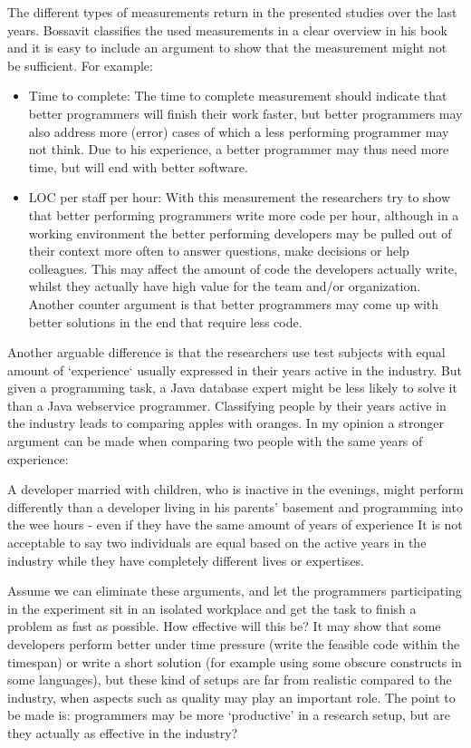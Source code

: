 The different types of measurements return in the presented studies over the last years.
Bossavit classifies the used measurements in a clear overview in his book \autocite[42-43]{bossavit2013leprechauns} and it is easy to include an argument to show that the measurement might not be sufficient.
For example:
\begin{itemize}[noitemsep]
\item Time to complete:
The time to complete measurement should indicate that better programmers will finish their work faster,
but better programmers may also address more (error) cases of which a less performing programmer may not think.
Due to his experience, a better programmer may thus need more time, but will end with better software.
\item LOC per staff per hour:
With this measurement the researchers try to show that better performing programmers write more code per hour,
although in a working environment the better performing developers may be pulled out of their context more often to answer questions, make decisions or help colleagues.
This may affect the amount of code the developers actually write, whilst they actually have high value for the team and/or organization.
Another counter argument is that better programmers may come up with better solutions in the end that require less code.
\end{itemize}

Another arguable difference is that the researchers use test subjects with equal amount of `experience` usually expressed in their years active in the industry.
But given a programming task, a Java database expert might be less likely to solve it than a Java webservice programmer.
Classifying people by their years active in the industry leads to comparing apples with oranges.
In my opinion a stronger argument can be made when comparing two people with the same years of experience:

A developer married with children, who is inactive in the evenings,
might perform differently than a developer living in his parents' basement and programming into the wee hours - even if they have the same amount of years of experience
It is not acceptable to say two individuals are equal based on the active years in the industry while they have completely different lives or expertises.

Assume we can eliminate these arguments, and let the programmers participating in the experiment sit in an isolated workplace and get the task to finish a problem as fast as possible.
How effective will this be?
It may show that some developers perform better under time pressure (write the feasible code within the timespan) or write a short solution (for example using some obscure constructs in some languages),
but these kind of setups are far from realistic compared to the industry, when aspects such as quality may play an important role.
The point to be made is: programmers may be more `productive' in a research setup, but are they actually as effective in the industry?

